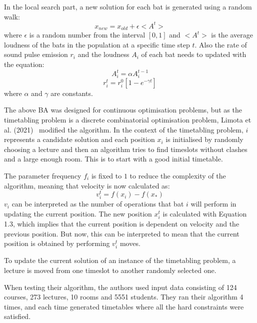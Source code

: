\documentclass[a4paper, 12pt]{report}
\begin{document}
In the local search part, a new solution for each bat is generated using a
random walk:
\begin{equation*}
	x_{new} = x_{old} + \epsilon < A^t >
\end{equation*}
where \( \epsilon \) is a random number from the interval \( [0,1] \) and
\( < A^t > \) is the average loudness of the bats in the population at a
specific time step \( t \).
Also the rate of sound pulse emission \( r_i \) and the loudness \( A_i \) of 
each bat needs to updated with the equation:
\begin{equation*}
	A_i^t = \alpha A_i^{t-1}
\end{equation*}
\begin{equation*}
	r_i^t = r_i^0 [1 - e^{-\gamma t}]
\end{equation*}
where \( \alpha \) and \( \gamma \) are constants.

The above BA was designed for continuous optimisation problems, but as the
timetabling problem is a discrete combinatorial optimisation problem, Limota et
al. (2021)~\cite{ba_example} modified the algorithm.
In the context of the timetabling problem, \( i \) represents a candidate 
solution and each position \( x_i \) is initialised by randomly choosing a
lecture and then an algorithm tries to find timeslots without clashes and a 
large enough room. This is to start with a good initial timetable.

The parameter frequency \( f_i \) is fixed to \( 1 \) to reduce the complexity 
of the algorithm, meaning that velocity is now calculated as:
\begin{equation*}
	v_i^t = f(x_i) - f(x_*)
\end{equation*}
\( v_i \) can be interpreted as the number of operations that bat \( i \) will 
perform in updating the current position. The new position \( x_i^t \) is
calculated with Equation 1.3, which implies that the current position is
dependent on velocity and the previous position. But now, this can be 
interpreted to mean that the current position is obtained by performing 
\( v_i^t \) moves.

To update the current solution of an instance of the timetabling problem, a
lecture is moved from one timeslot to another randomly selected one.

When testing their algorithm, the authors used input data consisting of 
124 courses, 273 lectures, 10 rooms and 5551 students. They ran their algorithm 
4 times, and each time generated timetables where all the hard constraints were
satisfied.
\end{document}

